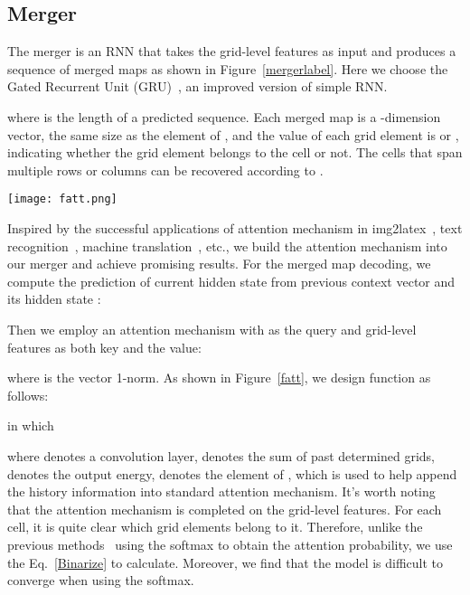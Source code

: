 \documentclass[review]{elsarticle}
\begin{document}
\subsection{Merger}

The merger is an RNN that takes the grid-level features  as input and produces a sequence of merged maps  as shown in Figure~\ref{mergerlabel}.
Here we choose the Gated Recurrent Unit (GRU)~\cite{GRU}, an improved version of simple RNN. 

where  is the length of a predicted sequence. Each merged map  is a -dimension vector, the same size as the element of , and the value of each grid element  is  or , indicating whether the  grid element belongs to the  cell or not. The cells that span multiple rows or columns can be recovered according to .

\begin{figure*}[htb]
	\centerline{\texttt{[image: fatt.png]}}
	\caption{The illustration of the attention mechanism. The prediction of current hidden state  and the grid-level features  is used as query and key, respectively.}
	\label{fatt}
\end{figure*}

Inspired by the successful applications of attention mechanism in img2latex~\cite{WAP,TAP}, text recognition~\cite{ASTER,SEED}, machine translation~\cite{Transformer}, etc., we build the attention mechanism into our merger and achieve promising results. For the merged map  decoding, we compute the prediction of current hidden state  from previous context vector  and its hidden state :
 
Then we employ an attention mechanism with  as the query and grid-level features  as both key and the value:

where  is the vector 1-norm. As shown in Figure~\ref{fatt}, we design  function as follows:

in which

where  denotes a convolution layer,  denotes the sum of past determined grids,  denotes the output energy,  denotes the element of , which is used to help append the history information into standard attention mechanism. It's worth noting that the attention mechanism is completed on the grid-level features. For each cell, it is quite clear which grid elements belong to it. Therefore, unlike the previous methods~\cite{WAP,TreeDecoder} using the softmax to obtain the attention probability, we use the  Eq.~\ref{Binarize} to calculate. Moreover, we find that the model is difficult to converge when using the softmax.
\end{document}

